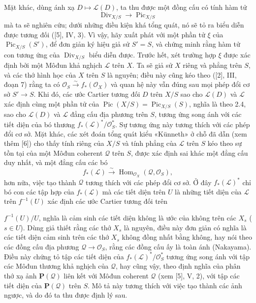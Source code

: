 \documentclass[11pt,twoside,openany]{book}
\numberwithin{equation}{section}
\newcommand{\src}[1]{%
  \phantomsection\hypertarget{src:\fgasourceid:#1}{}%
  \marginpar{\raggedleft\footnotesize\sffamily #1}%
}
\newcommand{\fgasourceid}{unset}
\begin{document}
Mặt khác, dùng ánh xạ $D\longmapsto\mathcal L(D)$, ta thu được một đồng cấu có
tính hàm tử
\begin{equation}
\operatorname{Div}_{X/S}\longrightarrow\operatorname{Pic}_{X/S}
\tag{+}
\end{equation}
mà ta sẽ nghiên cứu; dưới những điều kiện khá tổng quát, nó sẽ tỏ ra biểu diễn
được tương đối ([5], IV, 3). Vì vậy, hãy xuất phát với một phần tử $\xi$ của
$\operatorname{Pic}_{X/S}(S')$, để đơn giản ký hiệu giả sử $S'=S$, và chứng
minh rằng hàm tử con tương ứng của $\operatorname{Div}_{X/S}$ biểu diễn được.
Trước hết, xét trường hợp $\xi$ được xác định bởi một Môđun khả nghịch
$\mathcal L$ trên $X$. Ta sẽ giả sử $X$ riêng và phẳng trên $S$, và các thớ
hình học của $X$ trên $S$ là nguyên; điều này cũng kéo theo ([2], III, đoạn 7)
rằng ta có $\mathcal O_S\xrightarrow{\sim}f_*(\mathcal O_X)$ và quan hệ này
vẫn đúng sau mọi phép đổi cơ sở $S'\longrightarrow S$. Khi đó, các ước Cartier
tương đối $D$ trên $X/S$ sao cho $\mathcal L(D)$ và $\mathcal L$ xác định cùng
một phần tử của $\operatorname{Pic}(X/S)=\operatorname{Pic}_{X/S}(S)$, nghĩa
là theo 2.4, sao cho $\mathcal L(D)$ và $\mathcal L$ đẳng cấu địa phương trên
$S$, tương ứng song ánh với các tiết diện của bó thương
$f_*(\mathcal L)^*/\mathcal O_S^*$. Sự tương ứng này tương thích với các phép
đổi cơ sở. Mặt khác, các xét đoán tổng quát kiểu «Künneth» ở chỗ đã dẫn (xem
thêm [6]) cho thấy tính riêng của $X/S$ và tính phẳng của $\mathcal L$ trên
$S$ kéo theo sự tồn tại của một Môđun coherent $\mathcal Q$ trên $S$, được
xác định sai khác một đẳng cấu duy nhất, và một đẳng cấu các bó
\[
f_*(\mathcal L)\xrightarrow{\sim}
\operatorname{Hom}_{\mathcal O_X}(\mathcal Q,\mathcal O_S),
\]
 hơn nữa, việc tạo thành $\mathcal Q$ tương
thích với các phép đổi cơ sở. Ở đây $f_*(\mathcal L)^*$ chỉ bó con các tập hợp
của $f_*(\mathcal L)$ mà các tiết diện trên $U$ là những tiết diện của
$\mathcal L$ trên $f^{-1}(U)$ xác định các ước Cartier tương đối trên
\src{153}
$f^{-1}(U)/U$, nghĩa là cảm sinh các tiết diện không là ước của không trên các
$X_s$ ($s\in U$). Dùng giả thiết rằng các thớ $X_s$ là nguyên, điều này đơn
giản có nghĩa là các tiết diện cảm sinh trên các thớ $X_s$ không đồng nhất
bằng không, hay nói theo các đồng cấu địa phương
$\mathcal Q\longrightarrow\mathcal O_S$, rằng các đồng cấu ấy là toàn ánh
(Nakayama). Điều này chứng tỏ tập các tiết diện của
$f_*(\mathcal L)^*/\mathcal O_S^*$ tương ứng song ánh với tập các Môđun thương
khả nghịch của $\mathcal Q$, hay cũng vậy, theo định nghĩa của phân thớ xạ ảnh
$\mathbf P(\mathcal Q)$ liên kết với Môđun coherent $\mathcal Q$ (xem [5], V,
2), với tập các tiết diện của $\mathbf P(\mathcal Q)$ trên $S$. Mô tả này
tương thích với việc tạo thành các ảnh ngược, và do đó ta thu được định lý sau.
\end{document}
